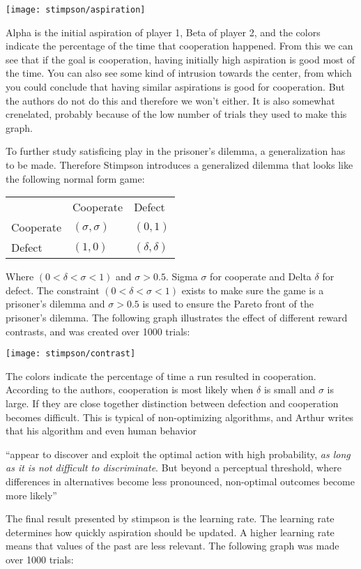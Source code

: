 \noindent
\texttt{[image: stimpson/aspiration]}

\cleared Alpha is the initial aspiration of player 1, Beta of player 2, and the colors
indicate the percentage of the time that cooperation happened. From this we can
see that if the goal is cooperation, having initially high aspiration is good
most of the time. You can also see some kind of intrusion towards the center,
from which you could conclude that having similar aspirations is good for
cooperation. But the authors do not do this and therefore we won't either.
It is also somewhat crenelated, probably because of the low number of trials
they used to make this graph.

\cleared To further study satisficing play in the prisoner's dilemma, a generalization
has to be made. Therefore Stimpson introduces a generalized dilemma that looks
like the following normal form game:
\begin{tabular}{lll}
            & Cooperate   & Defect \\
  Cooperate & $(\sigma,\sigma)$     & $(0,1)$  \\
  Defect    & $(1,0)$     & $(\delta,\delta)$  \\
\end{tabular}
\cleared Where $(0<\delta<\sigma<1)$ and $\sigma>0.5$. Sigma $\sigma$ for cooperate and
Delta $\delta$ for defect. The constraint $(0<\delta<\sigma<1)$ exists to make
sure the game is a prisoner's dilemma and $\sigma>0.5$ is used to ensure the
Pareto front of the prisoner's dilemma.
The following graph illustrates the effect of different reward contrasts,
and was created over 1000 trials:

\noindent
\texttt{[image: stimpson/contrast]}

\cleared The colors indicate the percentage of time a run resulted in cooperation.
According to the authors, cooperation is most likely when $\delta$ is small
and $\sigma$ is large. If they are close together distinction between 
defection and cooperation becomes difficult. This is typical of non-optimizing
algorithms, and Arthur writes that his algorithm and even human behavior

\cleared ``appear to discover and exploit the optimal action with high probability,
\emph{as long as it is not difficult to discriminate}. But beyond a perceptual
threshold, where differences in alternatives become less pronounced,
non-optimal outcomes become more likely'' \citep{arthur}

\cleared The final result presented by stimpson is the learning rate. The learning
rate determines how quickly aspiration should be updated. A higher learning
rate means that values of the past are less relevant. The following graph
was made over 1000 trials:

